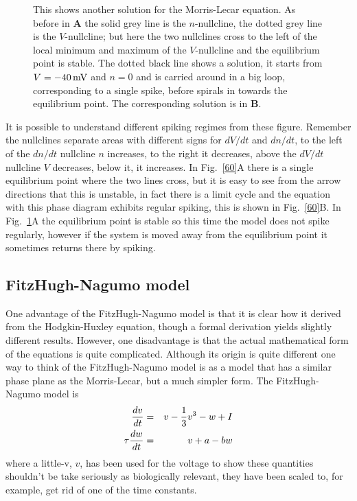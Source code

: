 \documentclass[11pt,a4paper]{scrartcl}
\newcommand{\mV}{\mbox{\,mV}}
\begin{document}
\begin{figure}
\begin{center}

\end{center}
\caption{This shows another solution for the Morris-Lecar equation. As before in \textbf{A} the solid grey line is the
  $n$-nullcline, the dotted grey line is the $V$-nullcline; but here the two
  nullclines cross to the left of the local minimum and maximum of the
  $V$-nullcline and the equilibrium point is stable. The dotted
  black line shows a solution, it starts from $V=-40\mV$ and $n=0$ and
  is carried around in a big loop, corresponding to a single spike, before spirals in towards the equilibrium point. The corresponding solution is in
  \textbf{B}.  \label{40}}
\end{figure}


It is possible to understand different spiking regimes from these
figure. Remember the nullclines separate areas with different signs
for $dV/dt$ and $dn/dt$, to the left of the $dn/dt$ nullcline $n$
increases, to the right it decreases, above the $dV/dt$ nullcline $V$
decreases, below it, it increases. In Fig.~\ref{60}A there is a
single equilibrium point where the two lines cross, but it is easy to
see from the arrow directions that this is unstable, in fact there is
a limit cycle and the equation with this phase diagram exhibits
regular spiking, this is shown in Fig.~\ref{60}B. In
Fig.~\ref{40}A the equilibrium point is stable so this time the
model does not spike regularly, however if the system is moved away
from the equilibrium point it sometimes returns there by spiking.

\subsection*{FitzHugh-Nagumo model}

One advantage of the FitzHugh-Nagumo model
\cite{FitzHugh1955,Nagumo1962} is that it is clear how it derived from
the Hodgkin-Huxley equation, though a formal derivation yields
slightly different results. However, one disadvantage is that the
actual mathematical form of the equations is quite
complicated. Although its origin is quite different one way to think
of the FitzHugh-Nagumo model is as a model that has a similar phase
plane as the Morris-Lecar, but a much simpler form. The
FitzHugh-Nagumo model is
\begin{eqnarray}
\frac{dv}{dt}&=&v-\frac{1}{3}v^3-w+I\cr
\tau\frac{dw}{dt}&=&v+a-bw
\end{eqnarray}
where a little-v, $v$, has been used for the voltage to show these
quantities shouldn't be take seriously as biologically relevant, they
have been scaled to, for example, get rid of one of the time
constants. 
\end{document}
